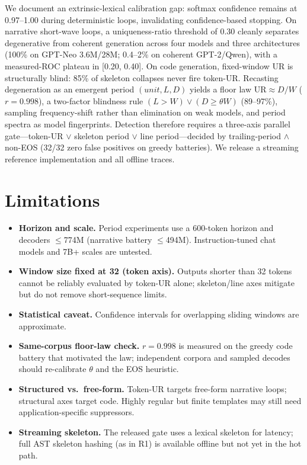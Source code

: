 \documentclass[11pt]{article}
\begin{document}
We document an extrinsic-lexical calibration gap: softmax confidence remains at 0.97--1.00 during deterministic loops, invalidating confidence-based stopping. On narrative short-wave loops, a uniqueness-ratio threshold of 0.30 cleanly separates degenerative from coherent generation across four models and three architectures (100\% on GPT-Neo 3.6M/28M; 0.4--2\% on coherent GPT-2/Qwen), with a measured-ROC plateau in [0.20, 0.40]. On code generation, fixed-window UR is structurally blind: 85\% of skeleton collapses never fire token-UR. Recasting degeneration as an emergent period $(unit, L, D)$ yields a floor law $\mathrm{UR}\approx D/W$ ($r=0.998$), a two-factor blindness rule $(L>W)\lor(D\ge\theta W)$ (89--97\%), sampling frequency-shift rather than elimination on weak models, and period spectra as model fingerprints. Detection therefore requires a three-axis parallel gate---token-UR $\lor$ skeleton period $\lor$ line period---decided by trailing-period $\land$ non-EOS (32/32 zero false positives on greedy batteries). We release a streaming reference implementation and all offline traces.

\section*{Limitations}

\begin{itemize}
    \item \textbf{Horizon and scale.} Period experiments use a 600-token horizon and decoders $\le$774M (narrative battery $\le$494M). Instruction-tuned chat models and 7B+ scales are untested.
    \item \textbf{Window size fixed at 32 (token axis).} Outputs shorter than 32 tokens cannot be reliably evaluated by token-UR alone; skeleton/line axes mitigate but do not remove short-sequence limits.
    \item \textbf{Statistical caveat.} Confidence intervals for overlapping sliding windows are approximate.
    \item \textbf{Same-corpus floor-law check.} $r=0.998$ is measured on the greedy code battery that motivated the law; independent corpora and sampled decodes should re-calibrate $\theta$ and the EOS heuristic.
    \item \textbf{Structured vs.\ free-form.} Token-UR targets free-form narrative loops; structural axes target code. Highly regular but finite templates may still need application-specific suppressors.
    \item \textbf{Streaming skeleton.} The released gate uses a lexical skeleton for latency; full AST skeleton hashing (as in R1) is available offline but not yet in the hot path.
\end{itemize}
\end{document}
